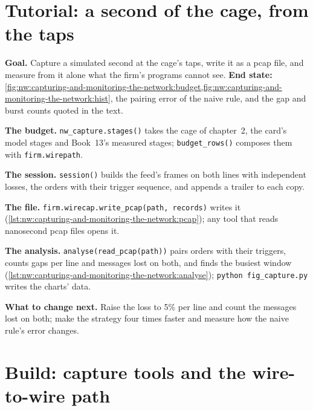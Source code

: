 \section{Tutorial: a second of the cage, from the taps}\label{tut:nw:capturing-and-monitoring-the-network:tut}

\begin{tutorial}
\textbf{Goal.} Capture a simulated second at the cage's taps, write it as a pcap file, and measure from it alone what the firm's
programs cannot see. \textbf{End state:} \cref{fig:nw:capturing-and-monitoring-the-network:budget,fig:nw:capturing-and-monitoring-the-network:hist},
the pairing error of the naive rule, and the gap and burst counts quoted in the text.
\begin{tutsteps}
\item \textbf{The budget.} \texttt{nw\_capture.stages()} takes the cage of chapter~2, the card's model stages and Book~13's measured stages;
  \texttt{budget\_rows()} composes them with \texttt{firm.wirepath}.
\item \textbf{The session.} \texttt{session()} builds the feed's frames on both lines with independent losses, the orders with their
  trigger sequence, and appends a trailer to each copy.
\item \textbf{The file.} \texttt{firm.wirecap.write\_pcap(path, records)} writes it (\cref{lst:nw:capturing-and-monitoring-the-network:pcap});
  any tool that reads nanosecond pcap files opens it.
\item \textbf{The analysis.} \texttt{analyse(read\_pcap(path))} pairs orders with their triggers, counts gaps per line and messages lost on
  both, and finds the busiest window (\cref{lst:nw:capturing-and-monitoring-the-network:analyse}); \texttt{python fig\_capture.py} writes the
  charts' data.
\end{tutsteps}
\textbf{What to change next.} Raise the loss to 5\% per line and count the messages lost on both; make the strategy four times faster and
measure how the naive rule's error changes.
\end{tutorial}

\section{Build: capture tools and the wire-to-wire path}\label{bld:nw:capturing-and-monitoring-the-network:wirecap}

